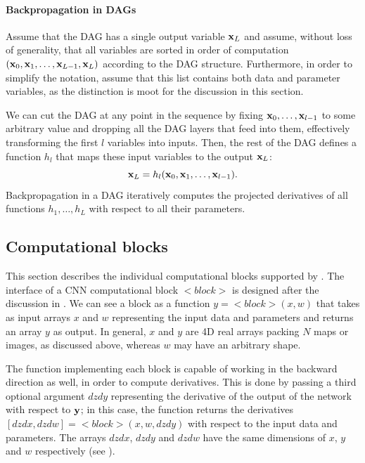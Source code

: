 \paragraph{Backpropagation in DAGs}\label{s:dag}

Assume that the DAG has a single output variable $\mathbf{x}_L$ and assume, without loss of generality, that all variables are sorted in order of computation $(\mathbf{x}_0,\mathbf{x}_1,\dots,\mathbf{x}_{L-1},\mathbf{x}_L)$ according to the DAG structure. Furthermore, in order to simplify the notation, assume that this list contains both data and parameter variables, as the distinction is moot for the discussion in this section.

We can cut the DAG at any point in the sequence by fixing $\mathbf{x}_0, \dots, \mathbf{x}_{l-1}$ to some arbitrary value and dropping all the DAG layers that feed into them, effectively transforming the first $l$ variables into inputs. Then, the rest of the DAG defines a function $h_l$ that maps these input variables to the output $\mathbf{x}_L$:
\[
\mathbf{x}_L = h_l(\mathbf{x}_0,\mathbf{x}_1,\dots,\mathbf{x}_{l-1}).
\]
Backpropagation in a DAG iteratively computes the projected derivatives of all functions $h_1,\dots,h_L$ with respect to all their parameters.




\subsection{Computational blocks}\label{s:blocks}

This section describes the individual computational blocks supported by \maskrcnn. The interface of a CNN computational block $<block>$ is designed after the discussion in . We can see a block as a function $y =<block>(x,w)$ that takes as input  arrays $x$ and $w$ representing the input data and parameters and returns an array $y$ as output. In general, $x$ and $y$ are 4D real arrays packing $N$ maps or images, as discussed above, whereas $w$ may have an arbitrary shape.

The function implementing each block is capable of working in the backward direction as well, in order to compute derivatives. This is done by passing a third optional argument $dzdy$ representing the derivative of the output of the network with respect to $\mathbf{y}$; in this case, the function returns the derivatives $[dzdx,dzdw] = <block>(x,w,dzdy)$ with respect to the input data and parameters. The arrays $dzdx$, $dzdy$ and $dzdw$ have the same dimensions of $x$, $y$ and $w$ respectively (see ).

